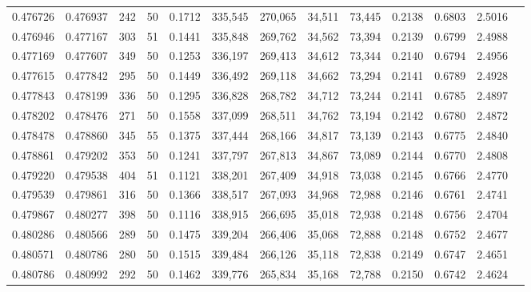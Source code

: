 \begin{tabular}{rrrrrrrrrrrrr}
0.476726 & 0.476937 &   242 &  50 &                                     0.1712 & 335,545 & 270,065 &  34,511 &  73,445 & 0.2138 & 0.6803 & 2.5016 \\
0.476946 & 0.477167 &   303 &  51 &                                     0.1441 & 335,848 & 269,762 &  34,562 &  73,394 & 0.2139 & 0.6799 & 2.4988 \\
0.477169 & 0.477607 &   349 &  50 &                                     0.1253 & 336,197 & 269,413 &  34,612 &  73,344 & 0.2140 & 0.6794 & 2.4956 \\
0.477615 & 0.477842 &   295 &  50 &                                     0.1449 & 336,492 & 269,118 &  34,662 &  73,294 & 0.2141 & 0.6789 & 2.4928 \\
0.477843 & 0.478199 &   336 &  50 &                                     0.1295 & 336,828 & 268,782 &  34,712 &  73,244 & 0.2141 & 0.6785 & 2.4897 \\
0.478202 & 0.478476 &   271 &  50 &                                     0.1558 & 337,099 & 268,511 &  34,762 &  73,194 & 0.2142 & 0.6780 & 2.4872 \\
0.478478 & 0.478860 &   345 &  55 &                                     0.1375 & 337,444 & 268,166 &  34,817 &  73,139 & 0.2143 & 0.6775 & 2.4840 \\
0.478861 & 0.479202 &   353 &  50 &                                     0.1241 & 337,797 & 267,813 &  34,867 &  73,089 & 0.2144 & 0.6770 & 2.4808 \\
0.479220 & 0.479538 &   404 &  51 &                                     0.1121 & 338,201 & 267,409 &  34,918 &  73,038 & 0.2145 & 0.6766 & 2.4770 \\
0.479539 & 0.479861 &   316 &  50 &                                     0.1366 & 338,517 & 267,093 &  34,968 &  72,988 & 0.2146 & 0.6761 & 2.4741 \\
0.479867 & 0.480277 &   398 &  50 &                                     0.1116 & 338,915 & 266,695 &  35,018 &  72,938 & 0.2148 & 0.6756 & 2.4704 \\
0.480286 & 0.480566 &   289 &  50 &                                     0.1475 & 339,204 & 266,406 &  35,068 &  72,888 & 0.2148 & 0.6752 & 2.4677 \\
0.480571 & 0.480786 &   280 &  50 &                                     0.1515 & 339,484 & 266,126 &  35,118 &  72,838 & 0.2149 & 0.6747 & 2.4651 \\
0.480786 & 0.480992 &   292 &  50 &                                     0.1462 & 339,776 & 265,834 &  35,168 &  72,788 & 0.2150 & 0.6742 & 2.4624 \\

\end{tabular}
